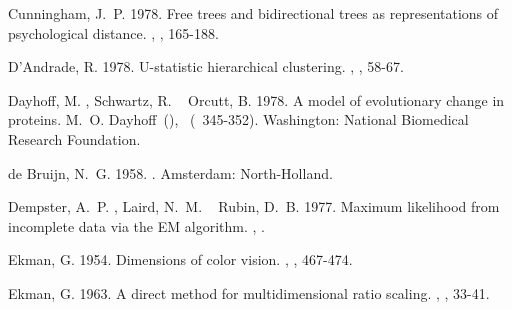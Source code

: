 \documentclass[11pt]{article}
\begin{document}
\begin{thebibliography}{}
%
%
Cunningham, J.~P.%
%
\newblock{}\BBOP{}1978\BBCP{}.
\newblock{}\BBOQ{}Free trees and bidirectional trees as representations of
  psychological distance.\BBCQ{}
\newblock{}, , 165-188.

%
%
D'Andrade, R.%
%
\newblock{}\BBOP{}1978\BBCP{}.
\newblock{}\BBOQ{}U-statistic hierarchical clustering.\BBCQ{}
\newblock{}, , 58-67.

%
%
Dayhoff, M.%
, Schwartz, R.%
\BCBL{}\ \BBA{} Orcutt, B.%
%
\newblock{}\BBOP{}1978\BBCP{}.
\newblock{}\BBOQ{}A model of evolutionary change in proteins.\BBCQ{}
\newblock{}\BIn{} M.~O. Dayhoff\ (\BED), \ (\BPG\ 345-352).
\newblock{}Washington: National Biomedical Research Foundation.

%
%
{de Bruijn}, N.~G.%
%
\newblock{}\BBOP{}1958\BBCP{}.
\newblock{}.
\newblock{}Amsterdam: North-Holland.

%
%
Dempster, A.~P.%
, Laird, N.~M.%
\BCBL{}\ \BBA{} Rubin, D.~B.%
%
\newblock{}\BBOP{}1977\BBCP{}.
\newblock{}\BBOQ{}Maximum likelihood from incomplete data via the {EM}
  algorithm.\BBCQ{}
\newblock{}, .

%
%
Ekman, G.%
%
\newblock{}\BBOP{}1954\BBCP{}.
\newblock{}\BBOQ{}Dimensions of color vision.\BBCQ{}
\newblock{}, , 467-474.

%
%
Ekman, G.%
%
\newblock{}\BBOP{}1963\BBCP{}.
\newblock{}\BBOQ{}A direct method for multidimensional ratio scaling.\BBCQ{}
\newblock{}, , 33-41.


\end{thebibliography}
\end{document}
